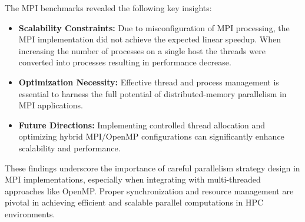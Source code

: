 \documentclass[
	report, %
	11pt, %
]{CSUniSchoolLabReport}
\newcounter{ct}
\begin{document}
The MPI benchmarks revealed the following key insights:

\begin{itemize}
	\item \textbf{Scalability Constraints:} Due to misconfiguration of MPI processing, the MPI implementation did not achieve the expected linear speedup. When increasing the number of processes on a single host the threads were converted into processes resulting in performance decrease.
	\item \textbf{Optimization Necessity:} Effective thread and process management is essential to harness the full potential of distributed-memory parallelism in MPI applications.
	\item \textbf{Future Directions:} Implementing controlled thread allocation and optimizing hybrid MPI/OpenMP configurations can significantly enhance scalability and performance.
\end{itemize}

These findings underscore the importance of careful parallelism strategy design in MPI implementations, especially when integrating with multi-threaded approaches like OpenMP. Proper synchronization and resource management are pivotal in achieving efficient and scalable parallel computations in HPC environments.
\end{document}
